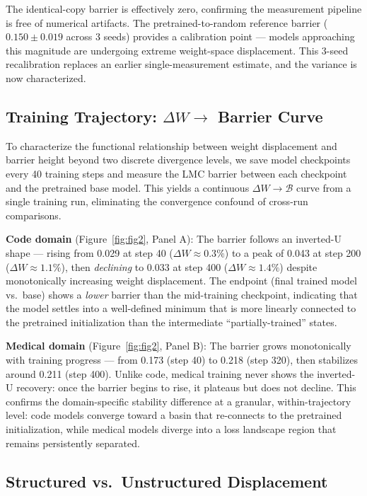 \documentclass[11pt,a4paper]{article}
\begin{document}
The identical-copy barrier is effectively zero, confirming the measurement pipeline is free of numerical artifacts. The pretrained-to-random reference barrier ($0.150 \pm 0.019$ across 3 seeds) provides a calibration point — models approaching this magnitude are undergoing extreme weight-space displacement. This 3-seed recalibration replaces an earlier single-measurement estimate, and the variance is now characterized.

\subsection{Training Trajectory: $\Delta W \to$ Barrier Curve}

To characterize the functional relationship between weight displacement and barrier height beyond two discrete divergence levels, we save model checkpoints every 40 training steps and measure the LMC barrier between each checkpoint and the pretrained base model. This yields a continuous $\Delta W \to \mathcal{B}$ curve from a single training run, eliminating the convergence confound of cross-run comparisons.

\textbf{Code domain} (Figure~\ref{fig:fig2}, Panel A): The barrier follows an inverted-U shape — rising from 0.029 at step 40 ($\Delta W \approx 0.3\%$) to a peak of 0.043 at step 200 ($\Delta W \approx 1.1\%$), then \emph{declining} to 0.033 at step 400 ($\Delta W \approx 1.4\%$) despite monotonically increasing weight displacement. The endpoint (final trained model vs.\ base) shows a \emph{lower} barrier than the mid-training checkpoint, indicating that the model settles into a well-defined minimum that is more linearly connected to the pretrained initialization than the intermediate ``partially-trained'' states.

\textbf{Medical domain} (Figure~\ref{fig:fig2}, Panel B): The barrier grows monotonically with training progress — from 0.173 (step 40) to 0.218 (step 320), then stabilizes around 0.211 (step 400). Unlike code, medical training never shows the inverted-U recovery: once the barrier begins to rise, it plateaus but does not decline. This confirms the domain-specific stability difference at a granular, within-trajectory level: code models converge toward a basin that re-connects to the pretrained initialization, while medical models diverge into a loss landscape region that remains persistently separated.

\subsection{Structured vs\label{sec:gaussian}.\ Unstructured Displacement}
\end{document}

